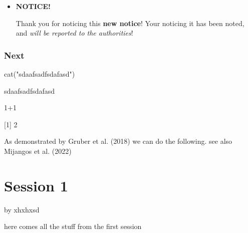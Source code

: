 \documentclass[
  letterpaper,
  DIV=11,
  numbers=noendperiod]{scrreprt}
\newenvironment{Shaded}{\begin{snugshade}}{\end{snugshade}}
\newcommand{\DecValTok}[1]{\textcolor[rgb]{0.25,0.63,0.44}{#1}}
\newcommand{\FunctionTok}[1]{\textcolor[rgb]{0.02,0.16,0.49}{#1}}
\newcommand{\NormalTok}[1]{\textcolor[rgb]{0.00,0.44,0.13}{#1}}
\newcommand{\SpecialCharTok}[1]{\textcolor[rgb]{0.25,0.44,0.63}{#1}}
\newcommand{\StringTok}[1]{\textcolor[rgb]{0.25,0.44,0.63}{#1}}
\newenvironment{infobox}[1]
  {
  \begin{blackbox}
  \begin{itemize}
  \renewcommand{\labelitemi}{
    \raisebox{-.7\height}[0pt][0pt]{
      {\setkeys{Gin}{width=3em,keepaspectratio}
        \texttt{[image: images/\#1]}}
    }
  }
  \setlength{\fboxsep}{1em}
  
  \item
  }
  {
  
  \end{itemize}
  \end{blackbox}
  }
\let\textttOrig\texttt
\renewcommand{\texttt}[1]{\textttOrig{\color{blue}{#1}}}
\begin{document}
\begin{infobox}{task}
\textbf{NOTICE!}

Thank you for noticing this \textbf{new notice}! Your noticing it has
been noted, and \emph{will be reported to the authorities}!

\end{infobox}

\hypertarget{next}{%
\subsection*{Next}\label{next}}

\begin{Shaded}
\begin{Highlighting}[]
\FunctionTok{cat}\NormalTok{(}\StringTok{"sdaafsadfsdafasd"}\NormalTok{)}
\end{Highlighting}
\end{Shaded}

\begin{Shaded}
\begin{Highlighting}[]
\NormalTok{sdaafsadfsdafasd}
\end{Highlighting}
\end{Shaded}

\begin{Shaded}
\begin{Highlighting}[]
\DecValTok{1}\SpecialCharTok{+}\DecValTok{1}
\end{Highlighting}
\end{Shaded}

\begin{Shaded}
\begin{Highlighting}[]
\NormalTok{[1] 2}
\end{Highlighting}
\end{Shaded}

As demonstrated by Gruber et al. (2018) we can do the following. see
also Mijangos et al. (2022)


\hypertarget{session-1}{%
\chapter*{Session 1}\label{session-1}}


by xhxhxsd

here comes all the stuff from the first session
\end{document}

